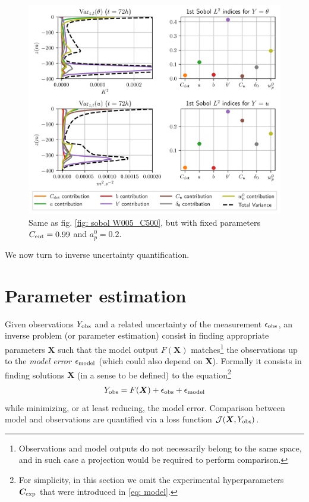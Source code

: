 \documentclass[draft]{agujournal2019}
\newcommand{\blu}[1]{{\color{BlueGreen} #1}}
\begin{document}
%
%
\begin{figure}
    \includegraphics[width=\textwidth]{figures/analysis_of_variance_beta1_ap0_W005_C500_NO_COR2048.png}
    \caption{Same as fig. \ref{fig: sobol W005_C500}, but with fixed parameters $C_{\rm ent}=0.99$ and $a_p^0=0.2$.}
    \label{fig: sobol beta1_ap0_W005_C500}
\end{figure}
%
%
\par We now turn to inverse uncertainty quantification. 
\section{Parameter estimation}\label{sec: inverse}
%
Given observations $Y_{\rm obs}$ and a related uncertainty of the measurement $\epsilon_{\rm obs}$, an inverse problem (or parameter estimation) consist in finding appropriate parameters $\bm X$ such that the model output $F(\bm X)$ matches\footnote{Observations and model outputs do not necessarily belong to the same space, and in such case a projection would be required to perform comparison.} the observations up to the \textit{model error} $\epsilon_{\rm model}$ (which could also depend on $\bm X$). Formally it consists in finding solutions $\bm X$ (in a sense to be defined) to the equation\footnote{For simplicity, in this section we omit the experimental hyperparameters $\bm C_{\rm exp}$ that were introduced in \eqref{eq: model}.}
%
\begin{eqnarray}\label{eq: inverse problem}
    Y_{\rm obs} = F(\bm X ) + \epsilon_{\rm obs} + \epsilon_{\rm model}
\end{eqnarray}
%
while minimizing, or at least reducing, the model error. Comparison between model and observations are quantified via a loss function $\mathcal{J}(\bm X, Y_{\rm obs})$. 
%
\end{document}
